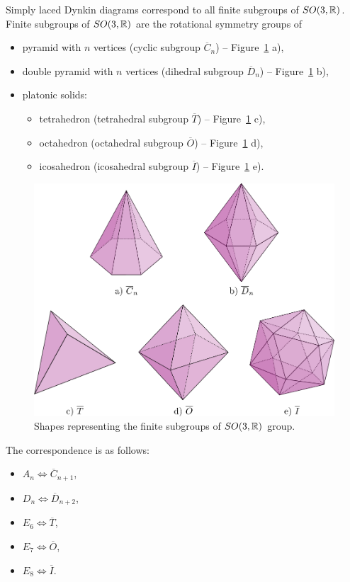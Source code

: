 Simply laced Dynkin diagrams correspond to all finite subgroups of
$SO(3,\R)$. Finite subgroups of
$SO(3,\R)$ are the rotational symmetry groups of
\begin{itemize}
    \item pyramid with $n$ vertices (cyclic subgroup $\overline{C}_n$) -- Figure~\ref{img:34} a),
    \item double pyramid with $n$ vertices (dihedral subgroup $\overline{D}_n$) -- Figure~\ref{img:34} b),
    \item platonic solids:
    \begin{itemize}
        \item tetrahedron (tetrahedral subgroup $\overline{T}$) -- Figure~\ref{img:34} c),
        \item octahedron (octahedral subgroup $\overline{O}$) -- Figure~\ref{img:34} d),
        \item icosahedron (icosahedral subgroup $\overline{I}$) -- Figure~\ref{img:34} e).
    \end{itemize}
\end{itemize}

\begin{figure}
    \centerline{\includegraphics[scale=0.5]{images/img34}}
    \caption[Shapes representing the finite subgroups of $SO(3,\R)$ group]
    {Shapes representing the finite subgroups of $SO(3,\R)$ group.}
    \label{img:34}
\end{figure}

The correspondence is as follows:
\begin{itemize}
    \item $A_n \iff \overline{C}_{n+1}$,
    \item $D_n \iff \overline{D}_{n+2}$,
    \item $E_6 \iff \overline{T}$,
    \item $E_7 \iff \overline{O}$,
    \item $E_8 \iff \overline{I}$.
\end{itemize}

